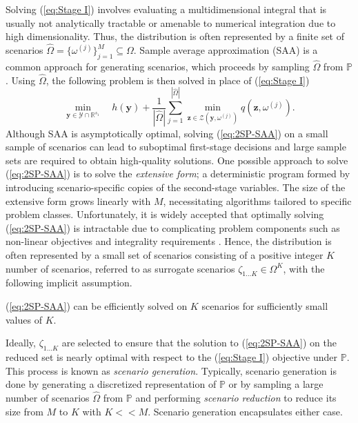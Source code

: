 Solving (\ref{eq:Stage I}) involves evaluating a multidimensional integral that is usually not analytically tractable or amenable to numerical integration due to high dimensionality. Thus, the distribution is often represented by a finite set of scenarios $\hat{\Omega} = \{\omega^{(j)}\}_{j=1}^M \subseteq \Omega$. Sample average approximation (SAA) is a common approach for generating scenarios, which proceeds by sampling $\hat{\Omega}$ from $\mathbb{P}$ \citep{kleywegt2002sample}. Using $\hat{\Omega}$, the following problem is then solved in place of (\ref{eq:Stage I})
\begin{equation}
\min_{\boldsymbol{y} \in \mathcal{Y} \cap \mathbb{R}^{s_1}} \quad   h(\boldsymbol{y}) + \frac{1}{|\hat{\Omega}|}\sum_{j = 1}^{|\hat{\Omega}|}  \min_{\boldsymbol{z} \in \mathcal{Z}(\boldsymbol{y}, \omega^{(j)})} q(\boldsymbol{z}, \omega^{(j)}) .
\label{eq:2SP-SAA} \tag{2SP-SAA}
\end{equation}
Although SAA is asymptotically optimal, solving (\ref{eq:2SP-SAA}) on a small sample of scenarios can lead to suboptimal first-stage decisions and large sample sets are required to obtain high-quality solutions. One possible approach to solve (\ref{eq:2SP-SAA}) is to solve the \textit{extensive form}; a deterministic program formed by introducing scenario-specific copies of the second-stage variables. The size of the extensive form grows linearly with $M$, necessitating algorithms tailored to specific problem classes. Unfortunately, it is widely accepted that optimally solving (\ref{eq:2SP-SAA}) is intractable due to complicating problem components such as non-linear objectives and integrality requirements \citep{patel2022neur2sp, wu2022learning}. Hence, the distribution is often represented by a small set of scenarios consisting of a positive integer $K$ number of scenarios, referred to as surrogate scenarios $\zeta_{1...K} \in \Omega^K$, with the following implicit assumption.
\begin{assumption}\label{a2}
    (\ref{eq:2SP-SAA}) can be efficiently solved on $K$ scenarios for sufficiently small values of $K$.
\end{assumption}
Ideally, $\zeta_{1...K}$ are selected to ensure that the solution to (\ref{eq:2SP-SAA}) on the reduced set is nearly optimal with respect to the (\ref{eq:Stage I}) objective under $\mathbb{P}$. This process is known as \textit{scenario generation}. Typically, scenario generation is done by generating a discretized representation of $\mathbb{P}$ or by sampling a large number of scenarios $\hat{\Omega}$ from $\mathbb{P}$ and performing \textit{scenario reduction} to reduce its size from $M$ to $K$ with $K << M$. Scenario generation encapsulates either case. 

